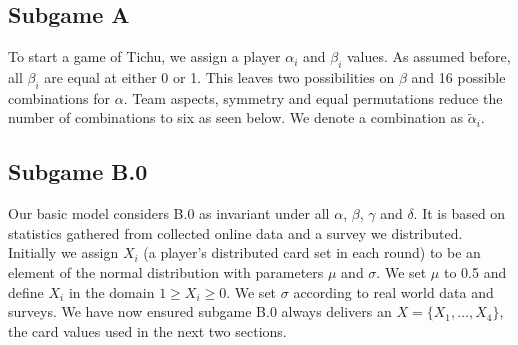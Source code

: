\subsection{Subgame A}
To start a game of Tichu, we assign a player $\alpha_i$ and $\beta_i$ values. As assumed before, all $\beta_i$ are equal at either 0 or 1. This leaves two possibilities on $\beta$ and 16 possible combinations for $\alpha$. Team aspects, symmetry and equal permutations reduce the number of combinations to six as seen below. We denote a combination as $\tilde{\alpha}_i$.\\
\begin{table}[h]
\end{table}
\begin{table}[h]
\end{table}
\subsection{Subgame B.0}
Our basic model considers B.0 as invariant under all $\alpha$, $\beta$, $\gamma$ and $\delta$. It is based on statistics gathered from collected online data and a survey we distributed. Initially we assign $X_i$ (a player’s distributed card set in each round) to be an element of the normal distribution with parameters $\mu$ and $\sigma$. We set $\mu$ to 0.5 and define $X_i$ in the domain $1\geq X_i \geq 0$. We set $\sigma$ according to real world data and surveys. We have now ensured subgame B.0 always delivers an $X = \{X_1, …, X_4\}$, the card values used in the next two sections.


